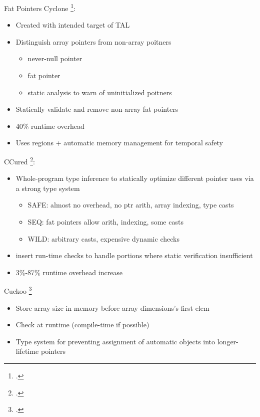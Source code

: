 \documentclass[aspectratio=169]{beamer}
\begin{document}
\begin{frame}{Fat Pointers}
Cyclone \footcite{jim_cyclone_2002}:
  \begin{itemize}
      \item Created with intended target of TAL
      \item Distinguish array pointers from non-array poitners
          \begin{itemize}
             \item never-null pointer
             \item fat pointer
             \item static analysis to warn of uninitialized poitners
           \end{itemize}
      \item Statically validate and remove non-array fat pointers
      \item 40\% runtime overhead
      \item Uses regions + automatic memory management for temporal safety
  \end{itemize}
CCured \footcite{necula_ccured:_2002}:
  \begin{itemize}
      \item Whole-program type inference to statically optimize different pointer uses via a strong type system
        \begin{itemize}
            \item SAFE: almost no overhead, no ptr arith, array indexing, type casts
            \item SEQ: fat pointers allow arith, indexing, some casts
            \item WILD: arbitrary casts, expensive dynamic checks
        \end{itemize}
    \item insert run-time checks to handle portions where static verification insufficient
    \item 3\%-87\% runtime overhead increase
  \end{itemize}
Cuckoo \footcite{west_cuckoo:_2005}
  \begin{itemize}
      \item Store array size in memory before array dimensions's first elem
      \item Check at runtime (compile-time if possible)
      \item Type system for preventing assignment of automatic objects into longer-lifetime pointers
  \end{itemize}
\end{frame}
\end{document}
